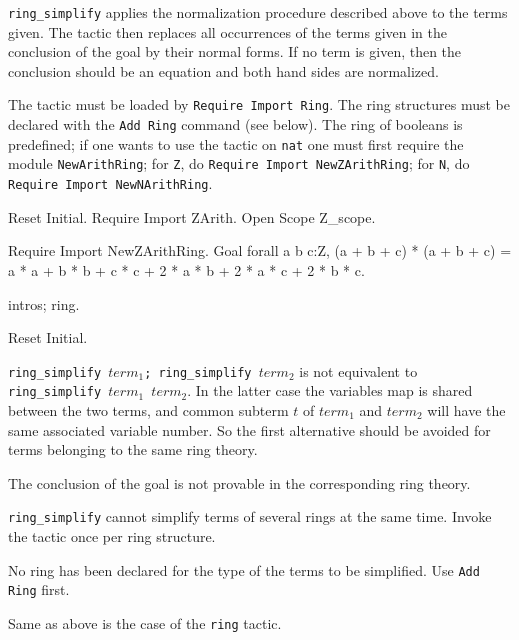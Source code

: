 {\tt ring\_simplify} applies the normalization procedure described
above to the terms given. The tactic then replaces all occurrences of
the terms given in the conclusion of the goal by their normal
forms. If no term is given, then the conclusion should be an equation
and both hand sides are normalized.

The tactic must be loaded by \texttt{Require Import Ring}. The ring
structures must be declared with the \texttt{Add Ring} command (see
below). The ring of booleans is predefined; if one wants to use the
tactic on \texttt{nat} one must first require the module
\texttt{NewArithRing}; for \texttt{Z}, do \texttt{Require Import
NewZArithRing}; for \texttt{N}, do \texttt{Require Import
NewNArithRing}.

\Example
\begin{coq_eval}
Reset Initial.
Require Import ZArith.
Open Scope Z_scope.
\end{coq_eval}
\begin{coq_example}
Require Import NewZArithRing.
Goal forall a b c:Z,
  (a + b + c) * (a + b + c) =
  a * a + b * b + c * c + 2 * a * b + 2 * a * c + 2 * b * c.
\end{coq_example}
\begin{coq_example}
intros; ring.
\end{coq_example}
\begin{coq_eval}
Reset Initial.
\end{coq_eval}

\Warning \texttt{ring\_simplify $term_1$; ring\_simplify $term_2$} is
not equivalent to \texttt{ring\_simplify $term_1$ $term_2$}. In the
latter case the variables map is shared between the two terms, and
common subterm $t$ of $term_1$ and $term_2$ will have the same
associated variable number. So the first alternative should be
avoided for terms belonging to the same ring theory.

\begin{ErrMsgs}
\item {}
  The conclusion of the goal is not provable in the corresponding ring
  theory.
\item {}
  {\tt ring\_simplify} cannot simplify terms of several rings at the
  same time. Invoke the tactic once per ring structure.
\item {}
  No ring has been declared for the type of the terms to be
  simplified. Use {\tt Add Ring} first.
\item {}
  Same as above is the case of the {\tt ring} tactic.
\end{ErrMsgs}

